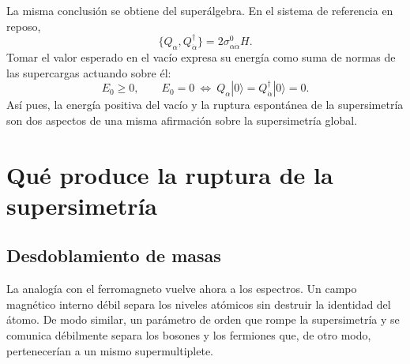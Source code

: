 La misma conclusión se obtiene del superálgebra. En el sistema de referencia en reposo,
\begin{equation}
\{Q_\alpha,Q_{\dot\alpha}^\dagger\}
=2\sigma^0_{\alpha\dot\alpha}H.
\end{equation}
Tomar el valor esperado en el vacío expresa su energía como suma de normas de las supercargas actuando sobre él:
\begin{equation}
E_0\ge0,
\qquad
E_0=0
\ \Longleftrightarrow\
Q_\alpha|0\rangle
=Q_{\dot\alpha}^\dagger|0\rangle=0.
\label{eq:l9-algebra-vacuum-energy}
\end{equation}
Así pues, la energía positiva del vacío y la ruptura espontánea de la supersimetría son dos aspectos de una misma afirmación sobre la supersimetría global.

\begin{center}
\end{center}


\section{Qué produce la ruptura de la supersimetría}

\subsection{Desdoblamiento de masas}

La analogía con el ferromagneto vuelve ahora a los espectros. Un campo magnético interno débil separa los niveles atómicos sin destruir la identidad del átomo. De modo similar, un parámetro de orden que rompe la supersimetría y se comunica débilmente separa los bosones y los fermiones que, de otro modo, pertenecerían a un mismo supermultiplete.

